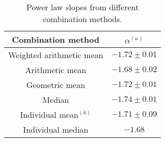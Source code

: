 \begin{table}
\centering
\begin{center}
\caption{Power law slopes from different combination methods.}
\begin{tabular}{cc}
\hline
\noalign{\smallskip}
Combination method &  $\alpha$$^{(a)}$ \\  
\hline


Weighted arithmetic mean  & $-1.72\pm 0.01$   \\
Arithmetic mean  & $-1.68\pm 0.02$   \\
Geometric mean  & $-1.72\pm 0.01$   \\
Median  & $-1.74\pm 0.01$   \\






Individual mean$^{(b)}$  & $-1.71\pm 0.09$   \\
Individual median & $-1.68$   \\


\hline
\hline
\end{tabular}
\end{center}


\end{table}



